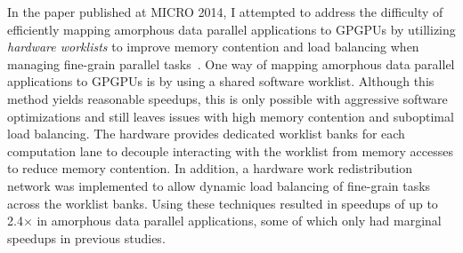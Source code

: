 In the paper published at MICRO 2014, I attempted to address the
difficulty of efficiently mapping amorphous data parallel applications to
GPGPUs by utillizing \emph{hardware worklists} to improve memory
contention and load balancing when managing fine-grain parallel
tasks~\cite{kim-hwwl-micro2014}. One way of mapping amorphous data
parallel applications to GPGPUs is by using a shared software
worklist. Although this method yields reasonable speedups, this is only
possible with aggressive software optimizations and still leaves issues
with high memory contention and suboptimal load balancing. The hardware
provides dedicated worklist banks for each computation lane to decouple
interacting with the worklist from memory accesses to reduce memory
contention. In addition, a hardware work redistribution network was
implemented to allow dynamic load balancing of fine-grain tasks across
the worklist banks. Using these techniques resulted in speedups of up to
2.4$\times$ in amorphous data parallel applications, some of which only
had marginal speedups in previous studies.

